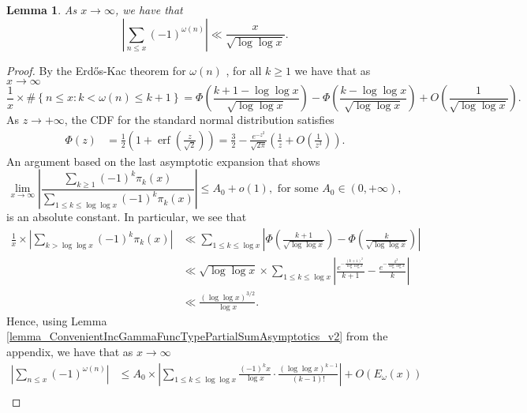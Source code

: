 \documentclass[11pt,reqno,a4letter]{article}
\numberwithin{figure}{section}
\numberwithin{table}{section}
\let\citep\cite
\newcommand{\cf}{\textit{cf.\ }}
\theoremstyle{plain}
\newtheorem{lemma}[theorem]{Lemma}
\numberwithin{theorem}{section}
\theoremstyle{definition}
\begin{document}
\begin{lemma} 
\label{cor_AsymptoticsForSignedSumsOfomegan_v1}
As $x \rightarrow \infty$, we have that 
\[
\left\lvert \sum_{n \leq x} (-1)^{\omega(n)} \right\rvert \ll 
     \frac{x}{\sqrt{\log\log x}}. 
\]
\end{lemma}
\begin{proof}
By the Erd\H{o}s-Kac theorem for $\omega(n)$ \cite[\S 1.7]{IWANIEC-KOWALSKI} \cite[\cf \S 7]{MV}, for all 
$k \geq 1$ we have that as $x \rightarrow \infty$ 
\[
\frac{1}{x} \times \#\left\{n \leq x: k < \omega(n) \leq k+1\right\} = 
     \Phi\left(\frac{k+1-\log\log x}{\sqrt{\log\log x}}\right) - 
     \Phi\left(\frac{k-\log\log x}{\sqrt{\log\log x}}\right) + O\left(
     \frac{1}{\sqrt{\log\log x}}\right). 
\]
As $z \rightarrow +\infty$, the CDF for the standard normal distribution satisfies 
\citep[\S 7]{NISTHB}
\begin{align*}
\Phi(z) & = \frac{1}{2}\left(1 + \operatorname{erf}\left(\frac{z}{\sqrt{2}}\right)\right) 
     = \frac{3}{2} - \frac{e^{-z^2}}{\sqrt{2\pi}} \left(\frac{1}{z} + O\left(\frac{1}{z^3}\right)\right). 
\end{align*}
An argument based on the last asymptotic expansion that shows 
\[
\lim_{x \rightarrow \infty} \left\lvert \frac{\sum\limits_{k \geq 1} (-1)^k \pi_k(x)}{ 
     \sum\limits_{1 \leq k \leq \log\log x} 
     (-1)^k \pi_k(x)} \right\rvert \leq A_0 + o(1), \text{\ for some\ } A_0 \in (0, +\infty), 
\]
is an absolute constant. 
In particular, we see that 
\begin{align*}
\frac{1}{x} \times \left\lvert \sum_{k > \log\log x} (-1)^{k} \pi_k(x) \right\rvert & \ll 
     \sum_{1 \leq k \leq \log x} \left\lvert \Phi\left(\frac{k+1}{\sqrt{\log\log x}}\right) - 
     \Phi\left(\frac{k}{\sqrt{\log\log x}}\right) \right\rvert \\ 
     & \ll \sqrt{\log\log x} \times 
     \sum_{1 \leq k \leq \log x} \left\lvert \frac{e^{-\frac{(k+1)^2}{\log\log x}}}{k+1} - 
     \frac{e^{-\frac{k^2}{\log\log x}}}{k} \right\rvert \\ 
     & \ll \frac{(\log\log x)^{3/2}}{\log x}. 
\end{align*}
Hence, using Lemma \ref{lemma_ConvenientIncGammaFuncTypePartialSumAsymptotics_v2} 
from the appendix, we have that as $x \rightarrow \infty$ 
\begin{align*} 
\left\lvert \sum_{n \leq x} (-1)^{\omega(n)} \right\rvert & \leq  
     A_0 \times 
     \left\lvert \sum_{1 \leq k \leq \log\log x} \frac{(-1)^k x}{\log x} \cdot 
     \frac{(\log\log x)^{k-1}}{(k-1)!} \right\rvert + O(E_{\omega}(x)) \\ 

\end{align*}
\end{proof}
\end{document}
